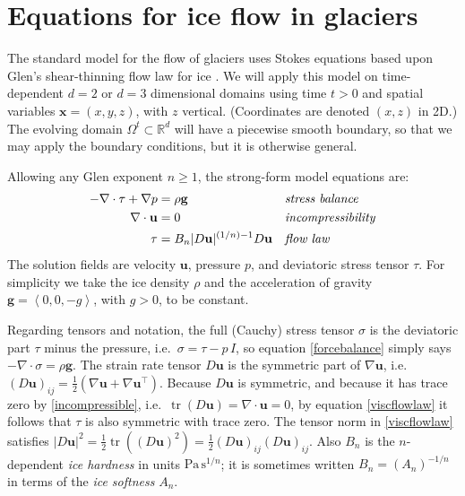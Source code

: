 \documentclass[letterpaper,final,12pt,reqno]{amsart}
\newcommand{\RR}{\mathbb{R}}
\newcommand{\grad}{\nabla}
\newcommand{\Div}{\nabla\cdot}
\newcommand{\trace}{\operatorname{tr}}
\newcommand{\bg}{\mathbf{g}}
\newcommand{\bu}{\mathbf{u}}
\newcommand{\bx}{\mathbf{x}}
\begin{document}
\section{Equations for ice flow in glaciers} \label{sec:strongform}

The standard model for the flow of glaciers uses Stokes equations based upon Glen's shear-thinning flow law for ice \cite{GreveBlatter2009,JouvetRappaz2011,SchoofHewitt2013}.  We will apply this model on time-dependent $d=2$ or $d=3$ dimensional domains using time $t>0$ and spatial variables $\bx=(x,y,z)$, with $z$ vertical.  (Coordinates are denoted $(x,z)$ in 2D.)  The evolving domain $\Omega^t \subset \RR^d$ will have a piecewise smooth boundary, so that we may apply the boundary conditions, but it is otherwise general.

Allowing any Glen exponent $n\ge 1$, the strong-form model equations are:
\begin{align}
- \nabla \cdot \tau + \nabla p &= \rho \bg &&\text{\emph{stress balance}} \label{forcebalance} \\
\nabla \cdot \bu &= 0 &&\text{\emph{incompressibility}} \label{incompressible} \\
\tau &= B_n |D\bu|^{(1/n) - 1} D\bu  &&\text{\emph{flow law}} \label{viscflowlaw}
\end{align}
The solution fields are velocity $\bu$, pressure $p$, and deviatoric stress tensor $\tau$.  For simplicity we take the ice density $\rho$ and the acceleration of gravity $\bg=\left<0,0,-g\right>$, with $g>0$, to be constant.

Regarding tensors and notation, the full (Cauchy) stress tensor $\sigma$ is the deviatoric part $\tau$ minus the pressure, i.e.~$\sigma = \tau - p\,I$, so equation \eqref{forcebalance} simply says $-\Div \sigma = \rho \bg$.  The strain rate tensor $D\bu$ is the symmetric part of $\grad \bu$, i.e.~$(D\bu)_{ij} = \frac{1}{2} \left(\grad\bu + \grad\bu^\top\right)$.  Because $D\bu$ is symmetric, and because it has trace zero by \eqref{incompressible}, i.e.~$\trace(D\bu)=\nabla \cdot \bu = 0$, by equation \eqref{viscflowlaw} it follows that $\tau$ is also symmetric with trace zero.  The tensor norm in \eqref{viscflowlaw} satisfies $|D\bu|^2 = \frac{1}{2} \trace\left((D\bu)^2\right) = \frac{1}{2} (D\bu)_{ij} (D\bu)_{ij}$.  Also $B_n$ is the $n$-dependent \emph{ice hardness} in units $\text{Pa}\,\text{s}^{1/n}$; it is sometimes written $B_n = (A_n)^{-1/n}$ in terms of the \emph{ice softness} $A_n$.
\end{document}
